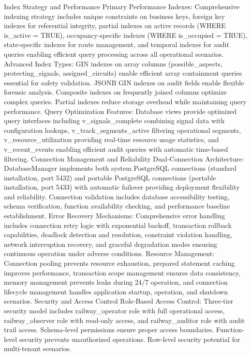 Index Strategy and Performance
Primary Performance Indexes: Comprehensive indexing strategy includes unique constraints on business keys, foreign key indexes for referential integrity, partial indexes on active records (WHERE is_active = TRUE), occupancy-specific indexes (WHERE is_occupied = TRUE), state-specific indexes for route management, and temporal indexes for audit queries enabling efficient query processing across all operational scenarios.
Advanced Index Types: GIN indexes on array columns (possible_aspects, protecting_signals, assigned_circuits) enable efficient array containment queries essential for safety validation. JSONB GIN indexes on audit fields enable flexible forensic analysis. Composite indexes on frequently joined columns optimize complex queries. Partial indexes reduce storage overhead while maintaining query performance.
Query Optimization Features: Database views provide optimized query interfaces including v_signals_complete combining signal data with configuration lookups, v_track_segments_active filtering operational segments, v_resource_utilization providing real-time resource usage statistics, and v_recent_events enabling efficient audit queries with automatic time-based filtering.
Connection Management and Reliability
Dual-Connection Architecture: DatabaseManager implements both system PostgreSQL connections (standard installation, port 5432) and portable PostgreSQL connections (portable installation, port 5433) with automatic failover providing deployment flexibility and reliability. Connection validation includes database accessibility testing, schema verification, function availability checking, and performance baseline establishment.
Error Recovery Mechanisms: Comprehensive error handling includes connection retry logic with exponential backoff, transaction rollback capabilities, deadlock detection and resolution, constraint violation handling, network interruption recovery, and graceful degradation modes ensuring continuous operation under adverse conditions.
Resource Management: Connection pooling prevents resource exhaustion, prepared statement caching improves performance, transaction scope management ensures data consistency, memory management prevents leaks during 24/7 operation, and connection lifecycle management handles application startup, operation, and shutdown scenarios.
Security and Access Control
Role-Based Access Control: Three-tier security model includes railway_operator role with full operational access, railway_observer role with read-only access, and railway_auditor role with audit trail access. Schema-level permissions ensure proper access boundaries. Function-level security prevents unauthorized operations. Row-level security potential for multi-tenant scenarios.
